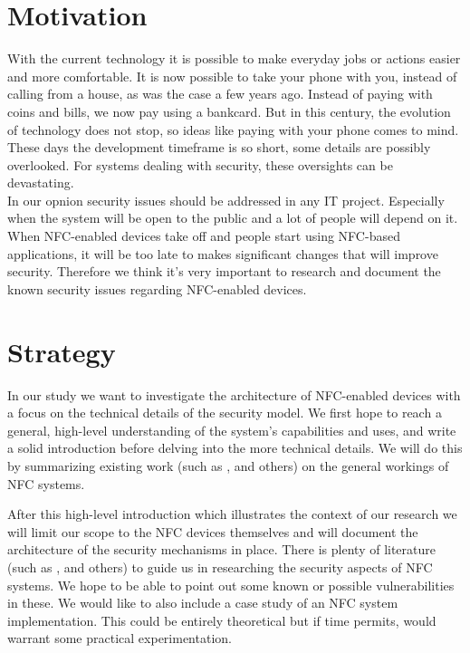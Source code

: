 \documentclass[11pt]{article} %
\begin{document}
\section{Motivation}

With the current technology it is possible to make everyday jobs or actions easier and more comfortable.
It is now possible to take your phone with you, instead of calling from a house, as was the case a few years ago.
Instead of paying with coins and bills, we now pay using a bankcard.
But in this century, the evolution of technology does not stop, so ideas like paying with your phone comes to mind.
These days the development timeframe is so short, some details are possibly overlooked.
For systems dealing with security, these oversights can be devastating.
\\

\noindent In our opnion security issues should be addressed in any IT project. Especially when the system will be open to the public and a lot of people will depend on it.
When NFC-enabled devices take off and people start using NFC-based applications, it will be too late to makes significant changes that will improve security.
Therefore we think it's very important to research and document the known security issues regarding NFC-enabled devices.

\section{Strategy}
In our study we want to investigate the architecture of NFC-enabled devices with a focus on the technical details of the security model.
We first hope to reach a general, high-level understanding of the system's capabilities and uses, and write a solid introduction before delving into the more technical details.
We will do this by summarizing existing work (such as \cite{Paus2007}, \cite{1731794} and others) on the general workings of NFC systems.

After this high-level introduction which illustrates the context of our research we will limit our scope to the NFC devices themselves and will document the architecture of the security mechanisms in place.
There is plenty of literature (such as \cite{mulliner09:vulnanamms}, \cite{Kfir05pickingvirtual} and others) to guide us in researching the security aspects of NFC systems. 
We hope to be able to point out some known or possible vulnerabilities in these.
We would like to also include a case study of an NFC system implementation.
This could be entirely theoretical but if time permits, would warrant some practical experimentation.
\end{document}
